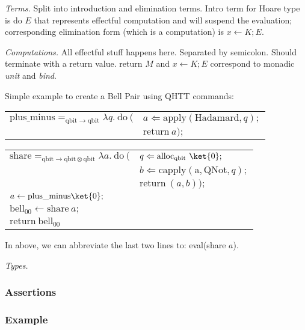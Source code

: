 \documentclass[acmsmall,review]{acmart}\settopmatter{printfolios=true,printccs=false,printacmref=false}
\begin{document}
\textit{Terms.} Split into introduction and elimination terms. Intro term for Hoare type is do $E$ that represents effectful computation and will suspend the evaluation; corresponding elimination form (which is a computation) is $x \gets K; E$.

\textit{Computations.} All effectful stuff happens here. Separated by semicolon. Should terminate with a return value. return $M$ and $x \gets K; E$ correspond to monadic \textit{unit} and \textit{bind}.

Simple example to create a Bell Pair using QHTT commands:\\

\begin{center}
\begingroup
\setlength{\tabcolsep}{0pt}
\begin{tabular}{ll}

	$\mathrm{plus\_minus} =_{\mathrm{qbit} \to \mathrm{qbit}} \lambda q.\ \mathrm{do}\ ($&$a \Leftarrow \mathrm{apply}(\mathrm{Hadamard}, q);$\\
																																	&$\mathrm{return}\ a);$\\
\end{tabular}

\begin{tabular}{ll}
	$\mathrm{share} =_{\mathrm{qbit} \to \mathrm{qbit} \otimes \mathrm{qbit}} \lambda a.\ \mathrm{do}\ ($&$q \Leftarrow \mathrm{alloc_{qbit}}\ \ket{0};$\\
																																							   &$b \Leftarrow \mathrm{capply}(\mathrm{a, QNot}, q);$\\
																																							   &$\mathrm{return}\ (a, b));$\\
	$a \gets \mathrm{plus\_minus} \ket{0};$ & \\
	$\mathrm{bell_{00}} \gets \mathrm{share}\ a;$ & \\
	$\mathrm{return}\ \mathrm{bell_{00}}$&
\end{tabular}
\endgroup
\end{center}

In above, we can abbreviate the last two lines to: eval(share $a$).

\textit{Types.}

\subsubsection{Assertions}

\subsubsection{Example}
\end{document}
